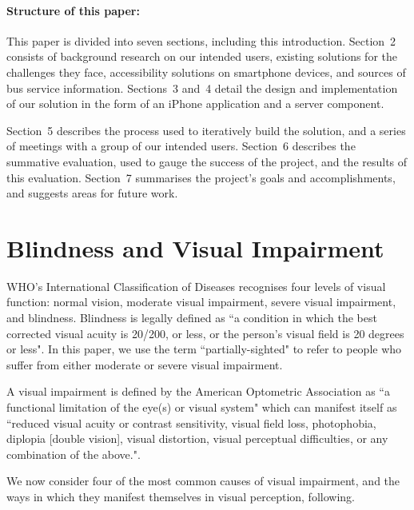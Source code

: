 \documentclass[10pt,twocolumn]{article}
\newcommand{\citep}[1]{}
\begin{document}
\paragraph{Structure of this paper:}
This paper is divided into seven sections, including this introduction.  Section~2 consists of background research on our intended users, existing solutions for the challenges they face, accessibility solutions on smartphone devices, and sources of bus service information.  Sections~3 and~4 detail the design and implementation of our solution in the form of an iPhone application and a server component.

Section~5 describes the process used to iteratively build the solution, and a series of meetings with a group of our intended users.  Section~6 describes the summative evaluation, used to gauge the success of the project, and the results of this evaluation.  Section~7 summarises the project's goals and accomplishments, and suggests areas for future work.


\section{Blindness and Visual Impairment}
\label{sec:iSimDescription}
WHO's International Classification of Diseases recognises four levels of visual function\citep{icd}:
 normal vision,
 moderate visual impairment,
 severe visual impairment, and
 blindness.
Blindness is legally defined as ``a condition in which the best corrected visual acuity is 20/200, or less, or the person's visual field is 20 degrees or less"\citep{webaim}.
In this paper, we use the term ``partially-sighted" to refer to people who suffer from either moderate or severe visual impairment.

A visual impairment is defined by the American Optometric Association as ``a functional limitation of the eye(s) or visual system" which can manifest itself as ``reduced visual acuity or contrast sensitivity, visual field loss, photophobia, diplopia [double vision], visual distortion, visual perceptual difficulties, or any combination of the above."\citep{aoa}.

We now consider four of the most common causes of visual impairment, and the ways in which they manifest themselves in visual perception, following\citep{webaimLowVision}.
\end{document}
